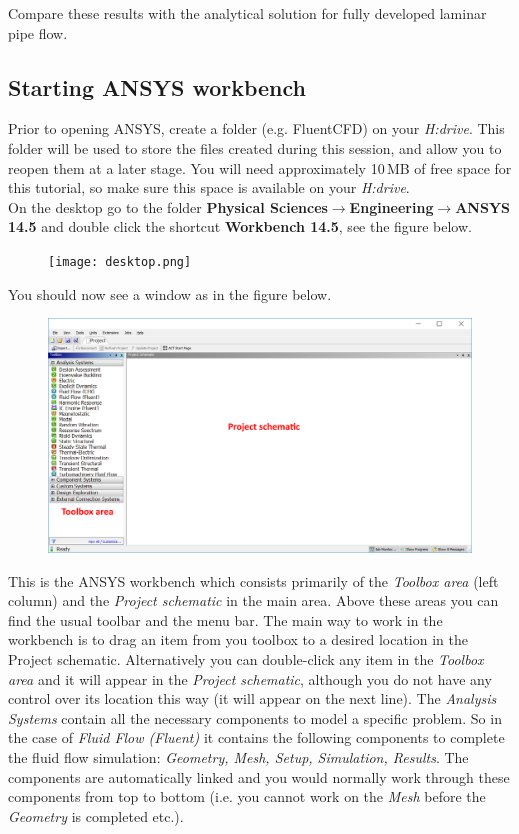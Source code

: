 \documentclass[11pt,a4paper,oneside]{scrartcl}
\newcommand\bfr[1]{\textcolor[rgb]{1,0.00,0.00}{\textbf{\textsf{#1}}}}
\newcommand\ra{$\rightarrow$}
\begin{document}
Compare these results with the analytical solution for fully developed laminar pipe flow.


\subsection{Starting ANSYS workbench}

Prior to opening ANSYS, create a folder (e.g. FluentCFD) on your \emph{H:drive}. This folder will be used to store the files created during this session, and allow you to reopen them at a later stage. You will need approximately 10\,MB of free space for this tutorial, so make sure this space is available on your \emph{H:drive}.\\

On the desktop go to the folder \bfr{Physical Sciences\ra Engineering\ra ANSYS 14.5} and double click the shortcut \bfr{Workbench 14.5}, see the figure below.

\begin{figure}[H]
\begin{center}
\texttt{[image: desktop.png]}
\end{center}
\end{figure}

You should now see a window as in the figure below.

\begin{figure}[H]
\begin{center}
\includegraphics[width=.8\textwidth,clip]{workbench.png}
\end{center}
\end{figure}

This is the ANSYS workbench which consists primarily of the \emph{Toolbox area} (left column) and the \emph{Project schematic} in the main area. Above these areas you can find the usual toolbar and the menu bar. The main way to work in the workbench is to drag an item from you toolbox to a desired location in the Project schematic. Alternatively you can double-click any item in the \emph{Toolbox area} and it will appear in the \emph{Project schematic}, although you do not have any control over its location this way (it will appear on the next line). The \emph{Analysis Systems} contain all the necessary components to model a specific problem. So in the case of \emph{Fluid Flow (Fluent)} it contains the following components to complete the fluid flow simulation: \emph{Geometry, Mesh, Setup, Simulation, Results}. The components are automatically linked and you would normally work through these components from top to bottom (i.e. you cannot work on the \emph{Mesh} before the \emph{Geometry} is completed etc.).
\end{document}
